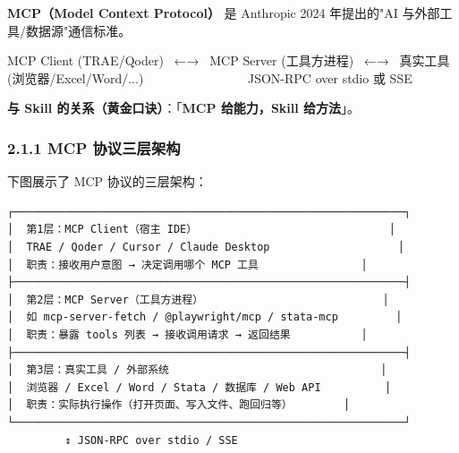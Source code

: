 \documentclass[
  american,
  chinese,
]{ctexart}
\begin{document}
{\textbf{\foreignlanguage{american}{MCP}\foreignlanguage{american}{（}\foreignlanguage{american}{Model}}}\textbf{\foreignlanguage{american}{ Context Protocol}\foreignlanguage{american}{）}}\foreignlanguage{american}{ }\foreignlanguage{american}{是}\foreignlanguage{american}{ Anthropic 2024 }{\foreignlanguage{american}{年提出的}\foreignlanguage{american}{"AI}}\foreignlanguage{american}{ }{\foreignlanguage{american}{与外部工具}}\foreignlanguage{american}{/}{\foreignlanguage{american}{数据源}\foreignlanguage{american}{"}\foreignlanguage{american}{通信标准}}\foreignlanguage{american}{。}

\foreignlanguage{american}{MCP Client
(TRAE/{{Qoder}}{){~ }←→{~ }MCP} Server (}{{\foreignlanguage{american}{工具方进程}}}{\foreignlanguage{american}{){~ }←→{~ }}{\foreignlanguage{american}{真实工具}}}\foreignlanguage{american}{ (}{\foreignlanguage{american}{浏览器}}\foreignlanguage{american}{/Excel/Word/...){~~~~~~~~~~~~~~~~
}JSON-RPC over {stdio} }\foreignlanguage{american}{或}\foreignlanguage{american}{ SSE }

\textbf{\foreignlanguage{american}{与}\foreignlanguage{american}{ Skill }}{\textbf{\foreignlanguage{american}{的关系（黄金口诀}}}\textbf{\foreignlanguage{american}{）}}\foreignlanguage{american}{：「}\textbf{\foreignlanguage{american}{MCP }}{\textbf{\foreignlanguage{american}{给能力，}\foreignlanguage{american}{Skill}}}\textbf{\foreignlanguage{american}{ }}{\textbf{\foreignlanguage{american}{给方法}}}\foreignlanguage{american}{」。}\foreignlanguage{american}{}

\subsubsection{\texorpdfstring{\foreignlanguage{american}{2.1.1 MCP }{协议三层架构}}{2.1.1 MCP 协议三层架构}}\label{mcp-three-layer-architecture}

{下图展示了}\foreignlanguage{american}{ MCP }{协议的三层架构：}\foreignlanguage{american}{}

\foreignlanguage{american}{}

\begin{verbatim}
┌─────────────────────────────────────────────────────────────┐
│  第1层：MCP Client（宿主 IDE）                              │
│  TRAE / Qoder / Cursor / Claude Desktop                    │
│  职责：接收用户意图 → 决定调用哪个 MCP 工具                │
├─────────────────────────────────────────────────────────────┤
│  第2层：MCP Server（工具方进程）                            │
│  如 mcp-server-fetch / @playwright/mcp / stata-mcp         │
│  职责：暴露 tools 列表 → 接收调用请求 → 返回结果           │
├─────────────────────────────────────────────────────────────┤
│  第3层：真实工具 / 外部系统                                 │
│  浏览器 / Excel / Word / Stata / 数据库 / Web API          │
│  职责：实际执行操作（打开页面、写入文件、跑回归等）        │
└─────────────────────────────────────────────────────────────┘
         ↕ JSON-RPC over stdio / SSE
\end{verbatim}
\end{document}
